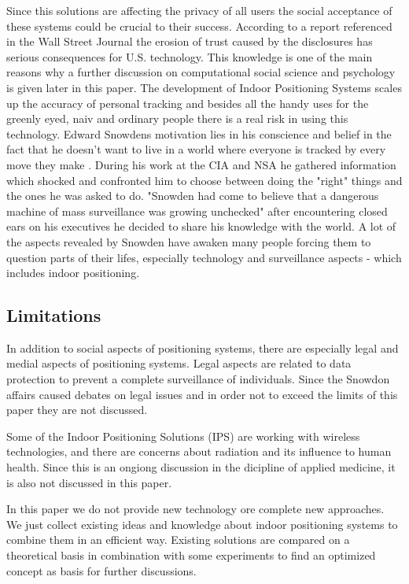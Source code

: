 Since this solutions are affecting the privacy of all users the social acceptance of these systems could be crucial to their success. 
According to a report referenced in the Wall Street Journal \parencite{snowdenEffect} the erosion of trust caused by the disclosures has serious consequences for U.S. technology. This knowledge is one of the main reasons why a further discussion on computational social science and psychology is given later in this paper. 
The development of Indoor Positioning Systems scales up the accuracy of personal tracking and besides all the handy uses for the greenly eyed, naiv and ordinary people there is a real risk in using this technology.   
Edward Snowdens motivation lies in his conscience and belief in the fact that he doesn't want to live in a world where everyone is tracked by every move they make \parencite{snowdenEffect}. During his work at the CIA and NSA he gathered information which shocked and confronted him to choose between doing the "right" things and the ones he was asked to do.
"Snowden had come to believe that a dangerous machine of mass surveillance was growing unchecked"  \textcite{snowdenEffect} after encountering closed ears on his executives he decided to share his knowledge with the world. A lot of the aspects revealed by Snowden have awaken many people forcing them to question parts of their lifes, especially technology and surveillance aspects - which includes indoor positioning. 

\subsection{Limitations}
In addition to social aspects of positioning systems, there are especially legal and medial aspects of positioning systems. Legal aspects are related to data protection to prevent a complete surveillance of individuals. Since the Snowdon affairs caused debates on legal issues \textcite{snowdenEffect} and in order not to exceed the limits of this paper they are not discussed. 

Some of the Indoor Positioning Solutions (IPS) are working with wireless technologies, and there are concerns about radiation and its influence to human health. Since this is an ongiong discussion in the dicipline of applied medicine, it is also not discussed in this paper.

In this paper we do not provide new technology ore complete new approaches. We just collect existing ideas and knowledge about indoor positioning systems to combine them in an efficient way. Existing solutions are compared on a theoretical basis in combination with some experiments to find an optimized concept as basis for further discussions.



